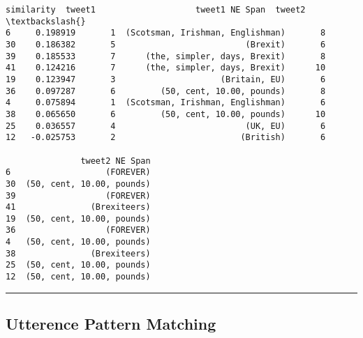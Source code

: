             \begin{tcolorbox}[breakable, size=fbox, boxrule=.5pt, pad at break*=1mm, opacityfill=0]
\begin{Verbatim}[commandchars=\\\{\}]
    similarity  tweet1                    tweet1 NE Span  tweet2  \textbackslash{}
6     0.198919       1  (Scotsman, Irishman, Englishman)       8
30    0.186382       5                          (Brexit)       6
39    0.185533       7      (the, simpler, days, Brexit)       8
41    0.124216       7      (the, simpler, days, Brexit)      10
19    0.123947       3                     (Britain, EU)       6
36    0.097287       6         (50, cent, 10.00, pounds)       8
4     0.075894       1  (Scotsman, Irishman, Englishman)       6
38    0.065650       6         (50, cent, 10.00, pounds)      10
25    0.036557       4                          (UK, EU)       6
12   -0.025753       2                         (British)       6

               tweet2 NE Span
6                   (FOREVER)
30  (50, cent, 10.00, pounds)
39                  (FOREVER)
41               (Brexiteers)
19  (50, cent, 10.00, pounds)
36                  (FOREVER)
4   (50, cent, 10.00, pounds)
38               (Brexiteers)
25  (50, cent, 10.00, pounds)
12  (50, cent, 10.00, pounds)
\end{Verbatim}
\end{tcolorbox}
        
    \begin{center}\rule{0.5\linewidth}{0.5pt}\end{center}

    \hypertarget{utterence-pattern-matching}{%
\subsection{Utterence Pattern
Matching}\label{utterence-pattern-matching}}

